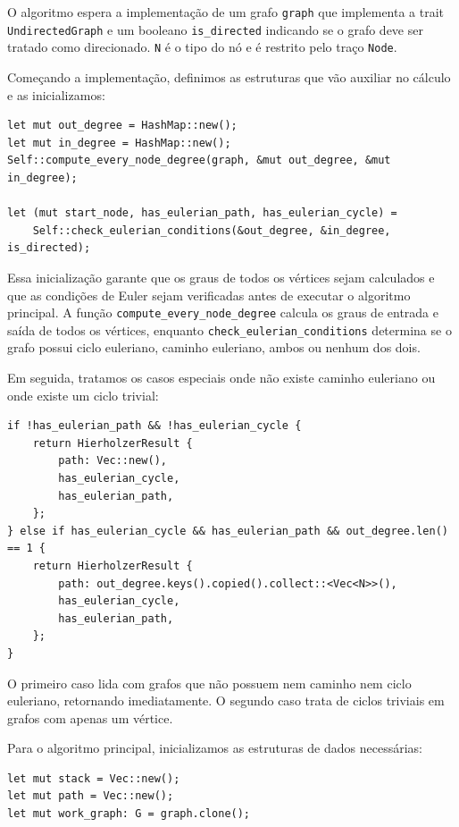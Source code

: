 O algoritmo espera a implementação de um grafo \texttt{graph} que implementa 
a trait \texttt{UndirectedGraph} e um booleano \texttt{is\_directed} indicando 
se o grafo deve ser tratado como direcionado. \texttt{N} é o tipo do nó e é 
restrito pelo traço \texttt{Node}.

Começando a implementação, definimos as estruturas que vão auxiliar no cálculo
e as inicializamos:

\begin{verbatim}
let mut out_degree = HashMap::new();
let mut in_degree = HashMap::new();
Self::compute_every_node_degree(graph, &mut out_degree, &mut in_degree);

let (mut start_node, has_eulerian_path, has_eulerian_cycle) =
    Self::check_eulerian_conditions(&out_degree, &in_degree, is_directed);
\end{verbatim}

Essa inicialização garante que os graus de todos os vértices sejam calculados
e que as condições de Euler sejam verificadas antes de executar o algoritmo
principal. A função \texttt{compute\_every\_node\_degree} calcula os graus de
entrada e saída de todos os vértices, enquanto \texttt{check\_eulerian\_conditions}
determina se o grafo possui ciclo euleriano, caminho euleriano, ambos ou nenhum dos dois.

Em seguida, tratamos os casos especiais onde não existe caminho euleriano ou
onde existe um ciclo trivial:

\begin{verbatim}
if !has_eulerian_path && !has_eulerian_cycle {
    return HierholzerResult {
        path: Vec::new(),
        has_eulerian_cycle,
        has_eulerian_path,
    };
} else if has_eulerian_cycle && has_eulerian_path && out_degree.len() == 1 {
    return HierholzerResult {
        path: out_degree.keys().copied().collect::<Vec<N>>(),
        has_eulerian_cycle,
        has_eulerian_path,
    };
}
\end{verbatim}

O primeiro caso lida com grafos que não possuem nem caminho nem ciclo euleriano,
retornando imediatamente. O segundo caso trata de ciclos triviais em grafos com
apenas um vértice.

Para o algoritmo principal, inicializamos as estruturas de dados necessárias:

\begin{verbatim}
let mut stack = Vec::new();
let mut path = Vec::new();
let mut work_graph: G = graph.clone();
\end{verbatim}

